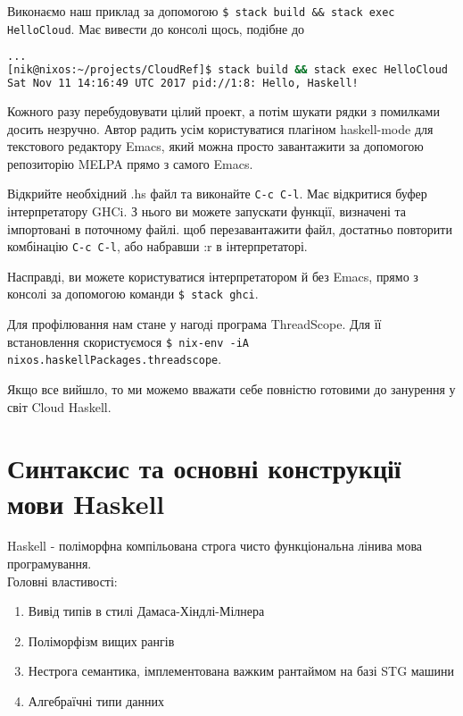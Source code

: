 \documentclass[12pt]{article}
\begin{document}
Виконаємо наш приклад за допомогою \lstinline{$ stack build && stack exec HelloCloud}. Має вивести до консолі щось, подібне до\\

\begin{lstlisting}[language=bash, caption={Будування та запуск HelloCloud.hs}]
...
[nik@nixos:~/projects/CloudRef]$ stack build && stack exec HelloCloud
Sat Nov 11 14:16:49 UTC 2017 pid://1:8: Hello, Haskell!
\end{lstlisting}

Кожного разу перебудовувати цілий проект, а потім шукати рядки з помилками досить незручно. Автор радить усім користуватися плагіном haskell-mode\cite{haskellModeManual} для текстового редактору Emacs\cite{emacs}, який можна просто завантажити за допомогою репозиторію MELPA прямо з самого Emacs\cite{haskellModeInstall}. 

Відкрийте необхідний .hs файл та виконайте \lstinline{С-с С-l}. Має відкритися буфер інтерпретатору GHCi\cite{ghci}. З нього ви можете запускати функції, визначені та імпортовані в поточному файлі. щоб перезавантажити файл, достатньо повторити комбінацію \lstinline{С-с С-l}, або набравши :r в інтерпретаторі. 

Насправді, ви можете користуватися інтерпретатором й без Emacs, прямо з консолі за допомогою команди \lstinline{$ stack ghci}. 

Для профілювання нам стане у нагоді програма ThreadScope. Для її встановлення скористуємося \lstinline{$ nix-env -iA nixos.haskellPackages.threadscope}.

Якщо все вийшло, то ми можемо вважати себе повністю готовими до занурення у світ Cloud Haskell.


\section{Синтаксис та основні конструкції мови Haskell}

Haskell - поліморфна компільована строга чисто функціональна лінива мова програмування.\\

Головні властивості:
\begin{enumerate}
\item Вивід типів в стилі Дамаса-Хіндлі-Мілнера
\item Поліморфізм вищих рангів
\item Нестрога семантика, імплементована важким рантаймом на базі STG машини
\item Алгебраїчні типи данних
\end{enumerate}
\end{document}
